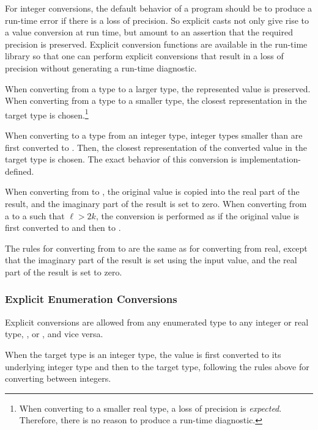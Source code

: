 \begin{rationale}
For integer conversions, the default behavior of a program should be to produce
a run-time error if there is a loss of precision.  So explicit casts not only
give rise to a value conversion at run time, but amount to an assertion
that the required precision is preserved.  Explicit conversion functions are
available in the run-time library so that one can perform explicit conversions that result in a loss
of precision without generating a run-time diagnostic.
\end{rationale}

When converting from a  type to a larger  type, the
represented value is preserved.  When converting from a  type to a
smaller  type, the closest representation in the target type is
chosen.\footnote{When converting to a smaller real type, a loss of precision is \emph{expected}.
Therefore, there is no reason to produce a run-time diagnostic.}

When converting to a  type from an integer type, integer types
smaller than  are first converted to .  Then, the closest
representation of the converted value in the target type is chosen.  The exact
behavior of this conversion is implementation-defined.

When converting from  to , the original
value is copied into the real part of the result, and the imaginary part of the
result is set to zero.  When converting from a  to
a  such that $\ell > 2k$, the conversion is performed as
if the original value is first converted to  and then
to \chpl{$\ell$}.

The rules for converting from  to  are the same as for
converting from real, except that the imaginary part of the result is set using
the input value, and the real part of the result is set to zero.

\subsubsection{Explicit Enumeration Conversions}
\label{Explicit_Enumeration_Conversions}

Explicit conversions are allowed from any enumerated type to any
integer or real type, , or , and vice versa.

When the target type is an integer type, the value is first converted to its
underlying integer type and then to the target type, following the rules above
for converting between integers.

